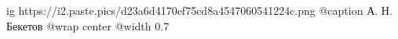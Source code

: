  
 
 
 
 

\ifcmt
	ig https://i2.paste.pics/d23a6d4170ef75cd8a4547060541224c.png
	@caption А. Н. Бекетов
  @wrap center
  @width 0.7
\fi
